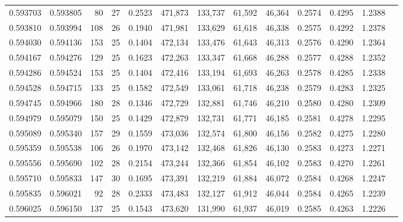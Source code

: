 \begin{tabular}{rrrrrrrrrrrrr}
0.593703 & 0.593805 &     80 &    27 &                                     0.2523 & 471,873 & 133,737 &  61,592 &  46,364 & 0.2574 & 0.4295 & 1.2388 \\
0.593810 & 0.593994 &    108 &    26 &                                     0.1940 & 471,981 & 133,629 &  61,618 &  46,338 & 0.2575 & 0.4292 & 1.2378 \\
0.594030 & 0.594136 &    153 &    25 &                                     0.1404 & 472,134 & 133,476 &  61,643 &  46,313 & 0.2576 & 0.4290 & 1.2364 \\
0.594167 & 0.594276 &    129 &    25 &                                     0.1623 & 472,263 & 133,347 &  61,668 &  46,288 & 0.2577 & 0.4288 & 1.2352 \\
0.594286 & 0.594524 &    153 &    25 &                                     0.1404 & 472,416 & 133,194 &  61,693 &  46,263 & 0.2578 & 0.4285 & 1.2338 \\
0.594528 & 0.594715 &    133 &    25 &                                     0.1582 & 472,549 & 133,061 &  61,718 &  46,238 & 0.2579 & 0.4283 & 1.2325 \\
0.594745 & 0.594966 &    180 &    28 &                                     0.1346 & 472,729 & 132,881 &  61,746 &  46,210 & 0.2580 & 0.4280 & 1.2309 \\
0.594979 & 0.595079 &    150 &    25 &                                     0.1429 & 472,879 & 132,731 &  61,771 &  46,185 & 0.2581 & 0.4278 & 1.2295 \\
0.595089 & 0.595340 &    157 &    29 &                                     0.1559 & 473,036 & 132,574 &  61,800 &  46,156 & 0.2582 & 0.4275 & 1.2280 \\
0.595359 & 0.595538 &    106 &    26 &                                     0.1970 & 473,142 & 132,468 &  61,826 &  46,130 & 0.2583 & 0.4273 & 1.2271 \\
0.595556 & 0.595690 &    102 &    28 &                                     0.2154 & 473,244 & 132,366 &  61,854 &  46,102 & 0.2583 & 0.4270 & 1.2261 \\
0.595710 & 0.595833 &    147 &    30 &                                     0.1695 & 473,391 & 132,219 &  61,884 &  46,072 & 0.2584 & 0.4268 & 1.2247 \\
0.595835 & 0.596021 &     92 &    28 &                                     0.2333 & 473,483 & 132,127 &  61,912 &  46,044 & 0.2584 & 0.4265 & 1.2239 \\
0.596025 & 0.596150 &    137 &    25 &                                     0.1543 & 473,620 & 131,990 &  61,937 &  46,019 & 0.2585 & 0.4263 & 1.2226 \\

\end{tabular}
